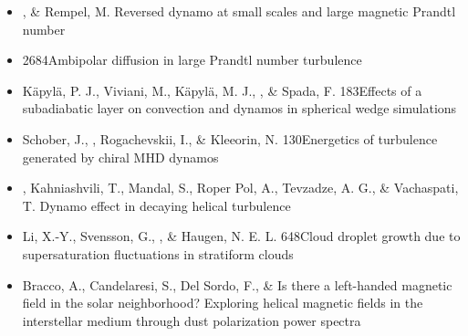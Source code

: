 \begin{itemize}
\item[{387.}~]
\Brandenburg, \& Rempel, M.
{Reversed dynamo at small scales and large magnetic Prandtl number}

\item[{386.}~]
\Brandenburg{}
{2684}{Ambipolar diffusion in large Prandtl number turbulence}

\item[{385.}~]
K\"apyl\"a, P. J., Viviani, M., K\"apyl\"a, M. J., \Brandenburg, \& Spada, F.
{183}{Effects of a subadiabatic layer on convection and dynamos in spherical wedge simulations}

\item[{384.}~]
Schober, J., \Brandenburg, Rogachevskii, I., \& Kleeorin, N.
{130}{Energetics of turbulence generated by chiral MHD dynamos}

\item[{383.}~]
\Brandenburg, Kahniashvili, T., Mandal, S., Roper Pol, A., Tevzadze, A. G., \& Vachaspati, T.
{Dynamo effect in decaying helical turbulence}

\item[{382.}~]
Li, X.-Y., Svensson, G., \Brandenburg, \& Haugen, N. E. L.
{648}{Cloud droplet growth due to supersaturation fluctuations in stratiform clouds}

\item[{381.}~]
Bracco, A., Candelaresi, S., Del Sordo, F., \& \Brandenburg{}
{Is there a left-handed magnetic field in the solar neighborhood? Exploring helical magnetic fields in the interstellar medium through dust polarization power spectra}


\end{itemize}
